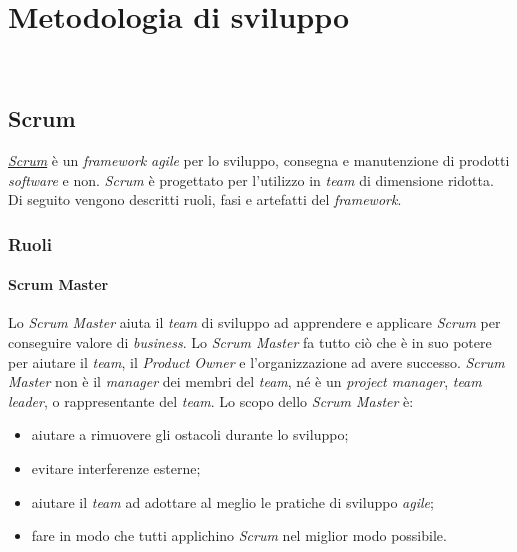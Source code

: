 
\chapter{Metodologia di sviluppo}
\label{cap:metodologia-lavoro}

\\

\section{Scrum}
\href{https://www.scrum.org/about}{\textit{Scrum}} è un \textit{framework} \textit{agile} per lo sviluppo, consegna e manutenzione di prodotti \textit{software} e non.
\textit{Scrum} è progettato per l'utilizzo in \textit{team} di dimensione ridotta. 
Di seguito vengono descritti ruoli, fasi e artefatti del \textit{framework}.

\subsection{Ruoli}

\subsubsection{Scrum Master}
Lo \textit{Scrum Master} aiuta il \textit{team} di sviluppo ad apprendere e applicare \textit{Scrum} per conseguire valore di \textit{business}. Lo \textit{Scrum Master} fa tutto ciò che è in suo potere per aiutare il \textit{team}, il \textit{Product Owner} e l'organizzazione ad avere successo. \textit{Scrum Master} non è il \textit{manager} dei membri del \textit{team}, né è un \textit{project manager}, \textit{team} \textit{leader}, o rappresentante del \textit{team}.
Lo scopo dello \textit{Scrum Master} è:
\begin{itemize}
    \item aiutare a rimuovere gli ostacoli durante lo sviluppo;
    \item evitare interferenze esterne;
    \item aiutare il \textit{team} ad adottare al meglio le pratiche di sviluppo \textit{agile};
    \item fare in modo che tutti applichino \textit{Scrum} nel miglior modo possibile.
\end{itemize}

